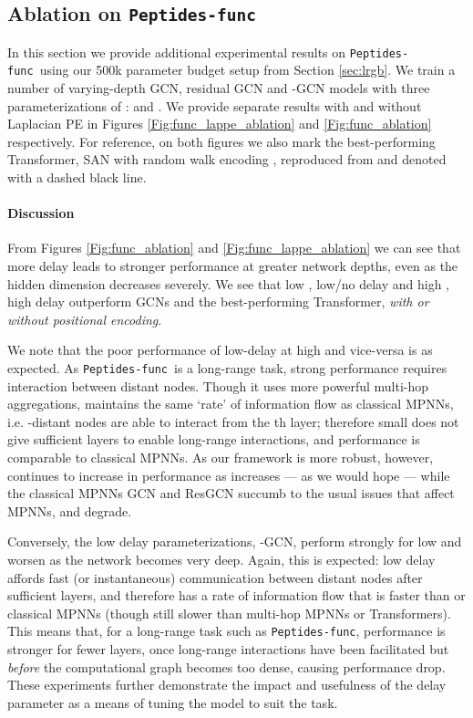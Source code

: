 \documentclass{article}
\newcommand{\func}{\texttt{Peptides-func}}
\theoremstyle{plain}
\theoremstyle{definition}
\theoremstyle{remark}
\begin{document}
\subsection{Ablation on \texttt{Peptides-func}}
In this section we provide additional experimental results on \func\ using our 500k parameter budget setup from Section \ref{sec:lrgb}. We train a number of varying-depth GCN, residual GCN and -GCN models with three parameterizations of :  and . We provide separate results with and without Laplacian PE \cite{dwivedi2020benchmarking} in Figures \ref{Fig:func_lappe_ablation} and \ref{Fig:func_ablation} respectively. For reference, on both figures we also mark the best-performing Transformer, SAN with random walk encoding \citep{kreuzer2021rethinking, dwivedi2021graph}, reproduced from \citet{dwivedi2022long} and denoted with a dashed black line.

\paragraph{Discussion}
From Figures \ref{Fig:func_ablation} and \ref{Fig:func_lappe_ablation}  we can see that more delay leads to stronger performance at greater network depths, even as the hidden dimension decreases severely. We see that low , low/no delay  and high , high delay  outperform GCNs and the best-performing Transformer, \emph{with or without positional encoding}.

We note that the poor performance of low-delay  at high  and vice-versa is as expected. As \func\ is a long-range task, strong performance requires interaction between distant nodes. Though it uses more powerful multi-hop aggregations,  maintains the same `rate' of information flow as classical MPNNs, i.e. -distant nodes are able to interact from the th layer; therefore small  does not give  sufficient layers to enable long-range interactions, and performance is comparable to classical MPNNs. As our framework is more robust, however,  continues to increase in performance as  increases --- as we would hope --- while the classical MPNNs GCN and ResGCN succumb to the usual issues that affect MPNNs, and degrade.

Conversely, the low delay parameterizations, -GCN, perform strongly for low  and worsen as the network becomes very deep. Again, this is expected: low delay affords fast (or instantaneous) communication between distant nodes after sufficient layers, and therefore has a rate of information flow that is faster than  or classical MPNNs (though still slower than multi-hop MPNNs or Transformers). This means that, for a long-range task such as \func, performance is stronger for fewer layers, once long-range interactions have been facilitated but \emph{before} the computational graph becomes too dense, causing performance drop. These experiments further demonstrate the impact and usefulness of the delay parameter as a means of tuning the model to suit the task.
\end{document}

